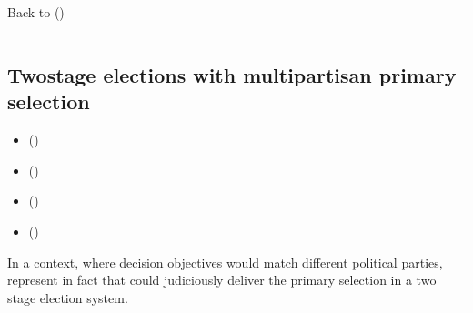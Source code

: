 \documentclass[a4paper,12pt,english]{sphinxhowto}
\begin{document}
\sphinxAtStartPar
Back to {\hyperref[\detokenize{pearls:pearls-label}]{}} ()


\bigskip\hrule\bigskip



\subsection{Two\sphinxhyphen{}stage elections with multipartisan primary selection}
\label{\detokenize{pearls:two-stage-elections-with-multipartisan-primary-selection}}\label{\detokenize{pearls:two-stage-elections-label}}
\begin{sphinxcontents}
\begin{itemize}
\item {} 
\sphinxAtStartPar
{}\label{\detokenize{pearls:id127}}{\hyperref[\detokenize{pearls:converting-voting-profiles-into-performance-tableaux}]{}} ()

\item {} 
\sphinxAtStartPar
{}\label{\detokenize{pearls:id128}}{\hyperref[\detokenize{pearls:multipartisan-primary-selection-of-eligible-candidates}]{}} ()

\item {} 
\sphinxAtStartPar
{}\label{\detokenize{pearls:id129}}{\hyperref[\detokenize{pearls:secondary-election-winner-determination}]{}} ()

\item {} 
\sphinxAtStartPar
{}\label{\detokenize{pearls:id130}}{\hyperref[\detokenize{pearls:multipartisan-preferences-in-divisive-politics}]{}} ()

\end{itemize}
\end{sphinxcontents}

\sphinxAtStartPar
In a  context, where decision objectives would match different political parties,  represent in fact  that could judiciously deliver the primary selection in a two stage election system.
\end{document}
